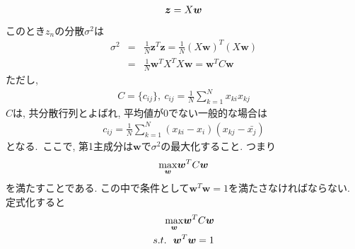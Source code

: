 \documentclass[dvipdfmx,a4j]{jsarticle}
\begin{document}
\begin{eqnarray*}
    \mbox{\boldmath $z$}=X\mbox{\boldmath $w$}
\end{eqnarray*}
このとき$z_{n}$の分散$\sigma^{2}$は
\begin{eqnarray*}
    \sigma^{2}&=&\frac{1}{N}\bm{z}^{T}\bm{z}=\frac{1}{N}(X\bm{w})^{T}(X\bm{w})\\
            &=&\frac{1}{N}\bm{w}^{T}X^{T}X\bm{w}=\bm{w}^{T}C\bm{w}
\end{eqnarray*}
ただし,
\begin{eqnarray*}
    C=\{c_{ij}\},\ c_{ij}=\frac{1}{N}\sum_{k=1}^{N}x_{ki}x_{kj}
\end{eqnarray*}
$C$は, 共分散行列とよばれ, 平均値が0でない一般的な場合は
\begin{eqnarray*}
    c_{ij}=\frac{1}{N}\sum_{k=1}^{N}(x_{ki}-{x_{i}})(x_{kj}-\bar{x_{j}})
\end{eqnarray*}
となる.\ ここで, 第1主成分は$\bm{w}$で$\sigma^{2}$の最大化すること. つまり
\begin{eqnarray*}
    \underset{\bm{w}}{\rm max}\bm{w}^{T}C\bm{w}
\end{eqnarray*}
を満たすことである. この中で条件として$\bm{w}^{T}\bm{w}=1$を満たさなければならない. 定式化すると
\begin{eqnarray*}
    \underset{\bm{w}}{\rm max}\bm{w}^{T}C\bm{w}\\
    s.t.\ \ \bm{w}^{T}\bm{w}=1
\end{eqnarray*}
\end{document}
